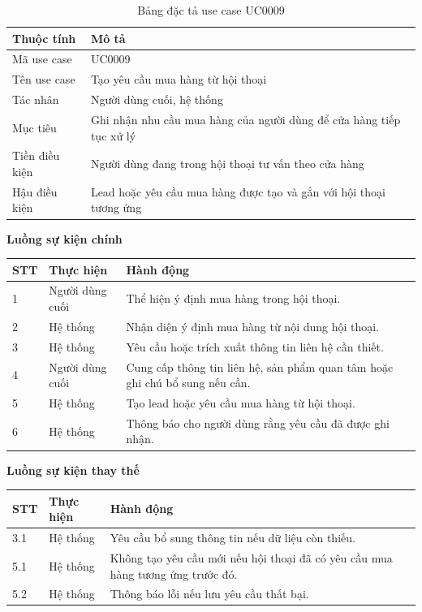 \documentclass[../DoAn.tex]{subfiles}
\begin{document}
\begin{table}[H]
\centering
\caption{Bảng đặc tả use case UC0009}
\label{table:uc0009}
\begin{tabular}{|p{}|p{}|}
\hline
\textbf{Thuộc tính} & \textbf{Mô tả} \\
\hline
Mã use case & UC0009 \\
\hline
Tên use case & Tạo yêu cầu mua hàng từ hội thoại \\
\hline
Tác nhân & Người dùng cuối, hệ thống \\
\hline
Mục tiêu & Ghi nhận nhu cầu mua hàng của người dùng để cửa hàng tiếp tục xử lý \\
\hline
Tiền điều kiện & Người dùng đang trong hội thoại tư vấn theo cửa hàng \\
\hline
Hậu điều kiện & Lead hoặc yêu cầu mua hàng được tạo và gắn với hội thoại tương ứng \\
\hline
\end{tabular}
\end{table}

\textbf{Luồng sự kiện chính}

\begin{table}[H]
\centering
\begin{tabular}{|p{}|p{}|p{}|}
\hline
\textbf{STT} & \textbf{Thực hiện} & \textbf{Hành động} \\
\hline
1 & Người dùng cuối & Thể hiện ý định mua hàng trong hội thoại. \\
\hline
2 & Hệ thống & Nhận diện ý định mua hàng từ nội dung hội thoại. \\
\hline
3 & Hệ thống & Yêu cầu hoặc trích xuất thông tin liên hệ cần thiết. \\
\hline
4 & Người dùng cuối & Cung cấp thông tin liên hệ, sản phẩm quan tâm hoặc ghi chú bổ sung nếu cần. \\
\hline
5 & Hệ thống & Tạo lead hoặc yêu cầu mua hàng từ hội thoại. \\
\hline
6 & Hệ thống & Thông báo cho người dùng rằng yêu cầu đã được ghi nhận. \\
\hline
\end{tabular}
\end{table}

\textbf{Luồng sự kiện thay thế}

\begin{table}[H]
\centering
\begin{tabular}{|p{}|p{}|p{}|}
\hline
\textbf{STT} & \textbf{Thực hiện} & \textbf{Hành động} \\
\hline
3.1 & Hệ thống & Yêu cầu bổ sung thông tin nếu dữ liệu còn thiếu. \\
\hline
5.1 & Hệ thống & Không tạo yêu cầu mới nếu hội thoại đã có yêu cầu mua hàng tương ứng trước đó. \\
\hline
5.2 & Hệ thống & Thông báo lỗi nếu lưu yêu cầu thất bại. \\
\hline
\end{tabular}
\end{table}
\end{document}
